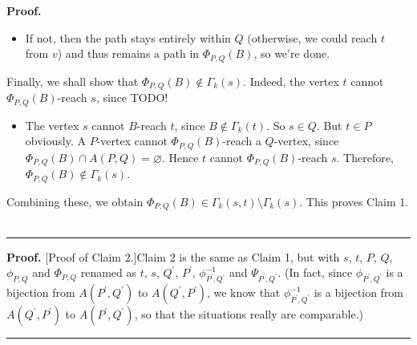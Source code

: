 \documentclass[numbers=enddot,12pt,final,onecolumn,notitlepage]{scrartcl}%
\theoremstyle{definition}
\newenvironment{proof}[1][Proof]{\noindent\textbf{#1.} }{\ \rule{0.5em}{0.5em}}
\theoremstyle{plainsl}
\begin{document}
\begin{proof}
\begin{itemize}
\item If not, then the path stays entirely within $Q$ (otherwise, we could
reach $t$ from $v$) and thus remains a path in $\Phi_{P,Q}\left(  B\right)  $,
so we're done.
\end{itemize}

Finally, we shall show that $\Phi_{P,Q}\left(  B\right)  \notin\Gamma
_{k}\left(  s\right)  $. Indeed, the vertex $t$ cannot $\Phi_{P,Q}\left(
B\right)  $-reach $s$, since TODO!

\begin{itemize}
\item The vertex $s$ cannot $B$-reach $t$, since $B\notin\Gamma_{k}\left(
t\right)  $. So $s\in Q$. But $t\in P$ obviously. A $P$-vertex cannot
$\Phi_{P,Q}\left(  B\right)  $-reach a $Q$-vertex, since  $\Phi_{P,Q}\left(
B\right)  \cap A\left(  P,Q\right)  =\varnothing$. Hence $t$ cannot
$\Phi_{P,Q}\left(  B\right)  $-reach $s$. Therefore, $\Phi_{P,Q}\left(
B\right)  \notin\Gamma_{k}\left(  s\right)  $.
\end{itemize}

Combining these, we obtain $\Phi_{P,Q}\left(  B\right)  \in\Gamma_{k}\left(
s,t\right)  \setminus\Gamma_{k}\left(  s\right)  $. This proves Claim 1.
\end{proof}

\begin{proof}
[Proof of Claim 2.]Claim 2 is the same as Claim 1, but with $s$, $t$, $P$,
$Q$, $\phi_{P,Q}$ and $\Phi_{P,Q}$ renamed as $t$, $s$, $Q^{\prime}$,
$P^{\prime}$, $\phi_{P^{\prime},Q^{\prime}}^{-1}$ and $\Psi_{P^{\prime
},Q^{\prime}}$. (In fact, since $\phi_{P^{\prime},Q^{\prime}}$ is a bijection
from $A\left(  P^{\prime},Q^{\prime}\right)  $ to $A\left(  Q^{\prime
},P^{\prime}\right)  $, we know that $\phi_{P^{\prime},Q^{\prime}}^{-1}$ is a
bijection from $A\left(  Q^{\prime},P^{\prime}\right)  $ to $A\left(
P^{\prime},Q^{\prime}\right)  $, so that the situations really are comparable.)
\end{proof}
\end{document}

